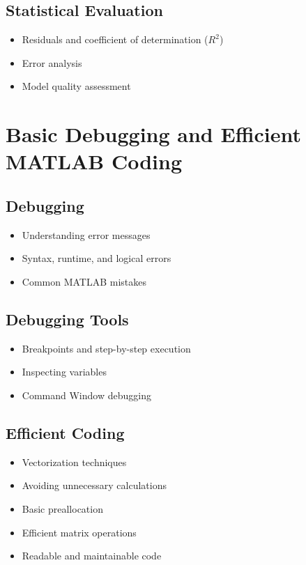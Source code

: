 \documentclass[11pt, a4paper]{article}
\begin{document}
\subsection{Statistical Evaluation}
\begin{itemize}
  \item Residuals and coefficient of determination ($R^2$)
  \item Error analysis
  \item Model quality assessment
\end{itemize}

\section{Basic Debugging and Efficient MATLAB Coding}

\subsection{Debugging}
\begin{itemize}
  \item Understanding error messages
  \item Syntax, runtime, and logical errors
  \item Common MATLAB mistakes
\end{itemize}

\subsection{Debugging Tools}
\begin{itemize}
  \item Breakpoints and step-by-step execution
  \item Inspecting variables
  \item Command Window debugging
\end{itemize}

\subsection{Efficient Coding}
\begin{itemize}
  \item Vectorization techniques
  \item Avoiding unnecessary calculations
  \item Basic preallocation
  \item Efficient matrix operations
  \item Readable and maintainable code
\end{itemize}
\end{document}
